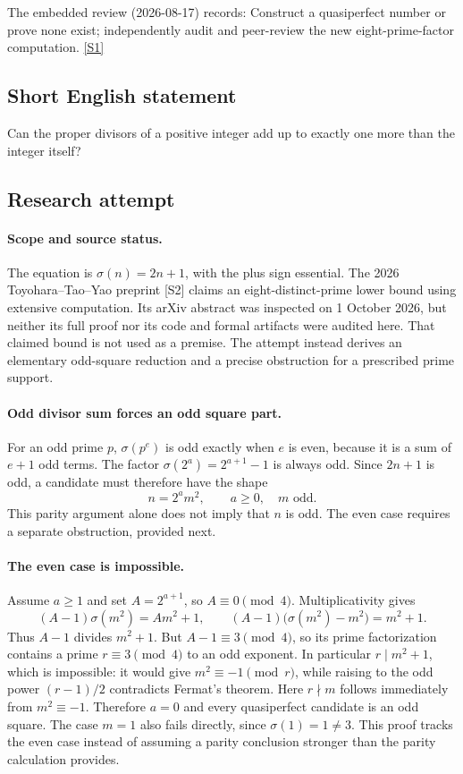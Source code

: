 \documentclass[11pt,a4paper]{article}
\newcommand{\sref}[2]{\hyperlink{source:#1:#2}{[S#2]}}
\begin{document}
The embedded review (2026-08-17) records: Construct a quasiperfect number or prove none exist; independently audit and peer-review the new eight-prime-factor computation. \sref{1250}{1}

\subsection{Short English statement}

Can the proper divisors of a positive integer add up to exactly one more than the integer itself?

\subsection{Research attempt}

\paragraph{Scope and source status.}
The equation is $\sigma(n)=2n+1$, with the plus sign essential. The
2026 Toyohara--Tao--Yao preprint [S2] claims an eight-distinct-prime
lower bound using extensive computation. Its arXiv abstract was
inspected on 1 October 2026, but neither its full proof nor its code and
formal artifacts were audited here. That claimed bound is not used as
a premise. The attempt instead derives an elementary odd-square
reduction and a precise obstruction for a prescribed prime support.

\paragraph{Odd divisor sum forces an odd square part.}
For an odd prime $p$, $\sigma(p^e)$ is odd exactly when $e$ is even,
because it is a sum of $e+1$ odd terms. The factor
$\sigma(2^a)=2^{a+1}-1$ is always odd. Since $2n+1$ is odd, a
candidate must therefore have the shape
\[
                         n=2^a m^2,
 \qquad a\ge0,\quad m\text{ odd}.
\]
This parity argument alone does not imply that $n$ is odd. The even
case requires a separate obstruction, provided next.

\paragraph{The even case is impossible.}
Assume $a\ge1$ and set $A=2^{a+1}$, so $A\equiv0\pmod4$.
Multiplicativity gives
\[
 (A-1)\sigma(m^2)=Am^2+1,
 \qquad
 (A-1)\bigl(\sigma(m^2)-m^2\bigr)=m^2+1.
\]
Thus $A-1$ divides $m^2+1$. But $A-1\equiv3\pmod4$, so its
prime factorization contains a prime $r\equiv3\pmod4$ to an odd
exponent. In particular $r\mid m^2+1$, which is impossible: it would
give $m^2\equiv-1\pmod r$, while raising to the odd power
$(r-1)/2$ contradicts Fermat's theorem. Here $r\nmid m$ follows
immediately from $m^2\equiv-1$.
Therefore $a=0$ and every quasiperfect candidate is an odd square.
The case $m=1$ also fails directly, since $\sigma(1)=1\ne3$.
This proof tracks the even case instead of assuming a parity conclusion
stronger than the parity calculation provides.
\end{document}
